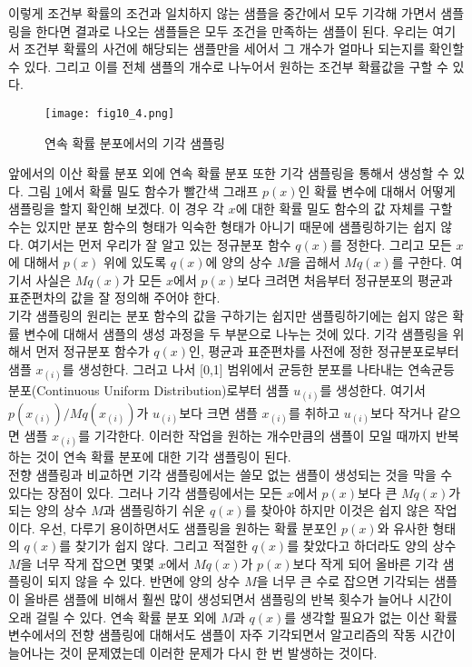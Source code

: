 \documentclass[a4paper]{oblivoir}
\begin{document}
이렇게 조건부 확률의 조건과 일치하지 않는 샘플을 중간에서 모두 기각해 가면서 샘플링을 한다면 결과로 나오는 샘플들은 모두 조건을 만족하는 샘플이 된다. 우리는 여기서 조건부 확률의 사건에 해당되는 샘플만을 세어서 그 개수가 얼마나 되는지를 확인할 수 있다. 그리고 이를 전체 샘플의 개수로 나누어서 원하는 조건부 확률값을 구할 수 있다. \\

\begin{figure}[ht] \centering 
\texttt{[image: fig10\_4.png]} 
\caption{연속 확률 분포에서의 기각 샘플링}
\label{fig:10-4}
\end{figure}  

앞에서의 이산 확률 분포 외에 연속 확률 분포 또한 기각 샘플링을 통해서 생성할 수 있다. 그림 \ref{fig:10-4}에서 확률 밀도 함수가 빨간색 그래프 $p(x)$인 확률 변수에 대해서 어떻게 샘플링을 할지 확인해 보겠다. 이 경우 각 $x$에 대한 확률 밀도 함수의 값 자체를 구할 수는 있지만 분포 함수의 형태가 익숙한 형태가 아니기 때문에 샘플링하기는 쉽지 않다. 여기서는 먼저 우리가 잘 알고 있는 정규분포 함수 $q(x)$를 정한다. 그리고 모든 $x$에 대해서 $p(x)$ 위에 있도록 $q(x)$에 양의 상수 $M$을 곱해서 $Mq(x)$를 구한다. 여기서 사실은 $Mq(x)$가 모든 $x$에서 $p(x)$보다 크려면 처음부터 정규분포의 평균과 표준편차의 값을 잘 정의해 주어야 한다. \\

기각 샘플링의 원리는 분포 함수의 값을 구하기는 쉽지만 샘플링하기에는 쉽지 않은 확률 변수에 대해서 샘플의 생성 과정을 두 부분으로 나누는 것에 있다. 기각 샘플링을 위해서 먼저 정규분포 함수가 $q(x)$인, 평균과 표준편차를 사전에 정한 정규분포로부터 샘플 $x_{(i)}$를 생성한다. 그러고 나서 [0,1] 범위에서 균등한 분포를 나타내는 연속균등분포(Continuous Uniform Distribution)로부터 샘플 $u_{(i)}$를 생성한다. 여기서 $p(x_{(i)})/Mq(x_{(i)})$가 $u_{(i)}$보다 크면 샘플 $x_{(i)}$를 취하고 $u_{(i)}$보다 작거나 같으면 샘플 $x_{(i)}$를 기각한다. 이러한 작업을 원하는 개수만큼의 샘플이 모일 때까지 반복하는 것이 연속 확률 분포에 대한 기각 샘플링이 된다. \\  

전향 샘플링과 비교하면 기각 샘플링에서는 쓸모 없는 샘플이 생성되는 것을 막을 수 있다는 장점이 있다. 그러나 기각 샘플링에서는 모든 $x$에서 $p(x)$보다 큰 $Mq(x)$가 되는 양의 상수 $M$과 샘플링하기 쉬운 $q(x)$를 찾아야 하지만 이것은 쉽지 않은 작업이다. 우선, 다루기 용이하면서도 샘플링을 원하는 확률 분포인 $p(x)$와 유사한 형태의 $q(x)$를 찾기가 쉽지 않다. 그리고 적절한 $q(x)$를 찾았다고 하더라도 양의 상수 $M$을 너무 작게 잡으면 몇몇 $x$에서 $Mq(x)$가 $p(x)$보다 작게 되어 올바른 기각 샘플링이 되지 않을 수 있다. 반면에 양의 상수 $M$을 너무 큰 수로 잡으면 기각되는 샘플이 올바른 샘플에 비해서 훨씬 많이 생성되면서 샘플링의 반복 횟수가 늘어나 시간이 오래 걸릴 수 있다. 연속 확률 분포 외에 $M$과 $q(x)$를 생각할 필요가 없는 이산 확률 변수에서의 전향 샘플링에 대해서도 샘플이 자주 기각되면서 알고리즘의 작동 시간이 늘어나는 것이 문제였는데 이러한 문제가 다시 한 번 발생하는 것이다.  \\
\end{document}
